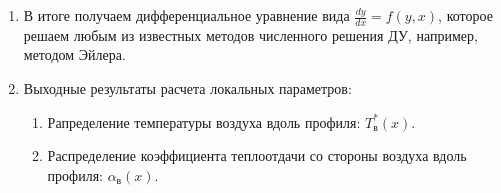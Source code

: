 \documentclass[a4paper,10pt]{article}
\begin{document}
\begin{enumerate}
        \item В итоге получаем дифференциальное уравнение вида $\frac{dy}{dx} = f(y, x)$, которое решаем любым из
        известных методов численного решения ДУ, например, методом Эйлера.

        \item Выходные результаты расчета локальных параметров:

        \begin{enumerate}
            \item Рапределение температуры воздуха вдоль профиля: $T_в^*(x)$.
            \item Распределение коэффициента теплоотдачи со стороны воздуха вдоль профиля: $\alpha_в (x)$.
        \end{enumerate}

    \end{enumerate}

\end{document}
